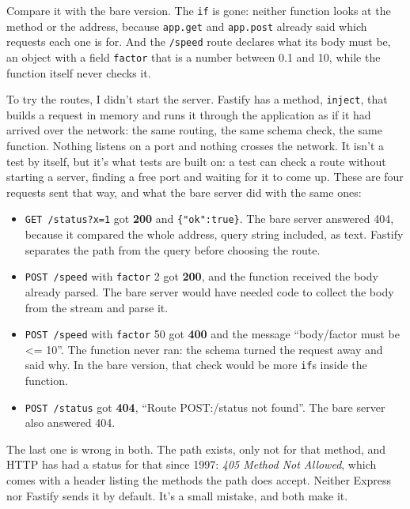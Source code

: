 Compare it with the bare version. The \texttt{if} is gone: neither function looks
at the method or the address, because \texttt{app.get} and \texttt{app.post}
already said which requests each one is for. And the \texttt{/speed} route
declares what its body must be, an object with a field \texttt{factor} that is
a number between 0.1 and 10, while the function itself never checks it.

To try the routes, I didn't start the server. Fastify has a method,
\texttt{inject}, that builds a request in memory and runs it through the
application as if it had arrived over the network: the same routing, the same
schema check, the same function. Nothing listens on a port and nothing crosses
the network. It isn't a test by itself, but it's what tests are built on: a test
can check a route without starting a server, finding a free port and waiting
for it to come up. These are four requests sent that way, and what the bare
server did with the same ones:

\begin{itemize}
  \item \texttt{GET /status?x=1} got \textbf{200} and \texttt{\{"ok":true\}}.
        The bare server answered 404, because it compared the whole address,
        query string included, as text. Fastify separates the path from the
        query before choosing the route.
  \item \texttt{POST /speed} with \texttt{factor} 2 got \textbf{200}, and the
        function received the body already parsed. The bare server would have
        needed code to collect the body from the stream and parse it.
  \item \texttt{POST /speed} with \texttt{factor} 50 got \textbf{400} and the
        message ``body/factor must be <= 10''. The function never ran: the
        schema turned the request away and said why. In the bare version, that
        check would be more \texttt{if}s inside the function.
  \item \texttt{POST /status} got \textbf{404}, ``Route POST:/status not
        found''. The bare server also answered 404.
\end{itemize}

The last one is wrong in both. The path exists, only not for that method, and HTTP has
had a status for that since 1997: \emph{405 Method Not Allowed}, which comes
with a header listing the methods the path does accept. Neither Express nor
Fastify sends it by default. It's a small mistake, and both make it.


